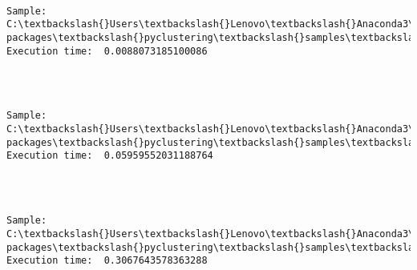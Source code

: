 \documentclass[11pt]{article}
\begin{document}
    \begin{center}
    \end{center}
    { \hspace*{\fill} \\}
    
    \begin{Verbatim}[commandchars=\\\{\}]
Sample:  C:\textbackslash{}Users\textbackslash{}Lenovo\textbackslash{}Anaconda3\textbackslash{}lib\textbackslash{}site-packages\textbackslash{}pyclustering\textbackslash{}samples\textbackslash{}samples\textbackslash{}fcps\textbackslash{}Hepta.data 		Execution time:  0.0088073185100086 


    \end{Verbatim}

    \begin{center}
    \end{center}
    { \hspace*{\fill} \\}
    
    \begin{Verbatim}[commandchars=\\\{\}]
Sample:  C:\textbackslash{}Users\textbackslash{}Lenovo\textbackslash{}Anaconda3\textbackslash{}lib\textbackslash{}site-packages\textbackslash{}pyclustering\textbackslash{}samples\textbackslash{}samples\textbackslash{}fcps\textbackslash{}Tetra.data 		Execution time:  0.05959552031188764 


    \end{Verbatim}

    \begin{center}
    \end{center}
    { \hspace*{\fill} \\}
    
    \begin{Verbatim}[commandchars=\\\{\}]
Sample:  C:\textbackslash{}Users\textbackslash{}Lenovo\textbackslash{}Anaconda3\textbackslash{}lib\textbackslash{}site-packages\textbackslash{}pyclustering\textbackslash{}samples\textbackslash{}samples\textbackslash{}fcps\textbackslash{}Atom.data 		Execution time:  0.3067643578363288 


    \end{Verbatim}
\end{document}
